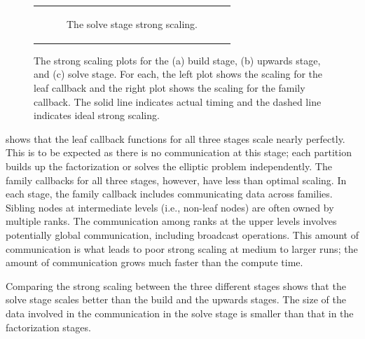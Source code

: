 \begin{figure}
\begin{tabular}{c}
\begin{subfigure}[t]{0.95\textwidth}
            \caption{The solve stage strong scaling.}
            \label{subfig:strong_solve}
        \end{subfigure}
        \\
    \end{tabular}
    \caption{The strong scaling plots for the (a) build stage, (b) upwards stage, and (c) solve stage. For each, the left plot shows the scaling for the leaf callback and the right plot shows the scaling for the family callback. The solid line indicates actual timing and the dashed line indicates ideal strong scaling.}
    \label{fig:strong_scaling_plots}
\end{figure}

 shows that the leaf callback functions for all three stages scale nearly perfectly. This is to be expected as there is no communication at this stage; each partition builds up the factorization or solves the elliptic problem independently. The family callbacks for all three stages, however, have less than optimal scaling. In each stage, the family callback includes communicating data across families. Sibling nodes at intermediate levels (i.e., non-leaf nodes) are often owned by multiple ranks. The communication among ranks at the upper levels involves potentially global communication, including broadcast operations. This amount of communication is what leads to poor strong scaling at medium to larger runs; the amount of communication grows much faster than the compute time.

Comparing the strong scaling between the three different stages shows that the solve stage scales better than the build and the upwards stages. The size of the data involved in the communication in the solve stage is smaller than that in the factorization stages.



